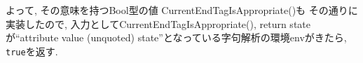 \documentclass[uplatex,a4j]{jsreport}
\begin{document}
よって, その意味を持つBool型の値 CurrentEndTagIsAppropriate()も その通りに実装したので, 
入力としてCurrentEndTagIsAppropriate(), return stateが``attribute value (unquoted) state''となっている字句解析の環境envがきたら, 
\texttt{true}を返す. 






\end{document}
